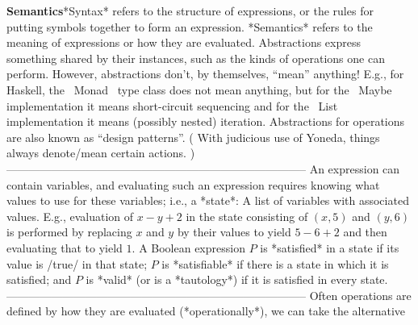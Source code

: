 \documentclass[11pt]{article}
\begin{document}
\vspace{1em}\textbf{Semantics}\quad\label{org-special-block-extras-glossary-Semantics}*Syntax* refers to the structure of expressions, or the rules for putting symbols together to form an expression. *Semantics* refers to the meaning of expressions or how they are evaluated.  Abstractions express something shared by their instances, such as the kinds of operations one can perform. However, abstractions don't, by themselves, “mean” anything! E.g., for Haskell, the ~Monad~ type class does not mean anything, but for the ~Maybe~ implementation it means short-circuit sequencing and for the ~List~ implementation it means (possibly nested) iteration. Abstractions for operations are also known as “design patterns”. ( With judicious use of Yoneda, things always denote/mean certain actions. ) --------------------------------------------------------------------------------  An expression can contain variables, and evaluating such an expression requires knowing what values to use for these variables; i.e., a *state*: A list of variables with associated values. E.g., evaluation of $x - y + 2$ in the state consisting of $(x, 5)$ and $(y, 6)$ is performed by replacing $x$ and $y$ by their values to yield $5 - 6 + 2$ and then evaluating that to yield $1$.  A Boolean expression $P$ is *satisfied* in a state if its value is /true/ in that state; $P$ is *satisfiable* if there is a state in which it is satisfied; and $P$ is *valid* (or is a *tautology*) if it is satisfied in every state. --------------------------------------------------------------------------------  Often operations are defined by how they are evaluated (*operationally*), we can take the alternative 
\end{document}

